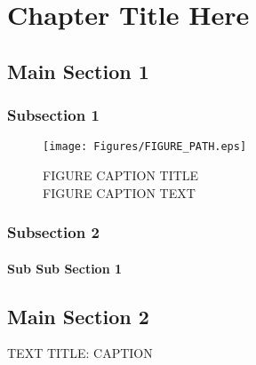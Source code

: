 \chapter{Chapter Title Here} \label{ChapterX}

\section{Main Section 1}
  \label{Chap:sec:name}

  \lipsum[3]

  \subsection{Subsection 1}
    \label{Chap:subsec:name}

    \lipsum[1]

    \begin{figure} %
      \centering 
      \texttt{[image: Figures/FIGURE\_PATH.eps]}
      \caption[FIGURE TOC NAME]
      {FIGURE CAPTION TITLE \\[0.25cm]
        FIGURE CAPTION TEXT
        }
      \label{Chap:fig:FIGURE LINK NAME}
      \end{figure}

  \subsection{Subsection 2}

    \lipsum[1]

      \subsubsection{Sub Sub Section 1}
        \label{Chap:subsubsec:name}

        \lipsum[1]

\section{Main Section 2}

  \lipsum[1]

  \begin{table} %
  \caption[TOC TITLE] 
    {
     TEXT TITLE: CAPTION
     }
   \label{CHAPTER:tab:LABEL NAME}
   
   \end{table}

\cleardoublepage